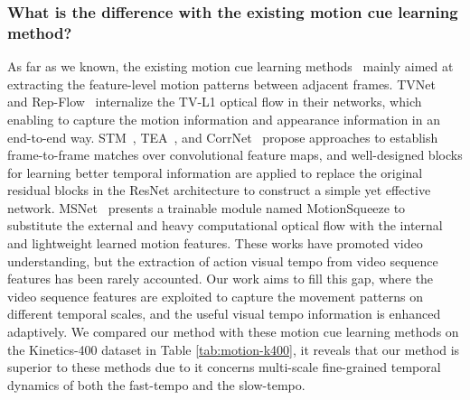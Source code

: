\documentclass[journal]{IEEEtran}
\begin{document}
\subsubsection{What is the difference with the existing motion cue learning method?}
As far as we known, the existing motion cue learning methods~\cite{fan2018end,kwon2020motionsqueeze,piergiovanni2019representation,jiang2019stm,wang2020video} mainly aimed at extracting the feature-level motion patterns between adjacent frames. TVNet~\cite{fan2018end} and Rep-Flow~\cite{fan2018end,piergiovanni2019representation} internalize the TV-L1 optical flow in their networks, which enabling to capture the motion information and appearance information in an end-to-end way. STM~\cite{jiang2019stm}, TEA~\cite{li2020tea}, and CorrNet~\cite{wang2020video} propose approaches to establish frame-to-frame matches over convolutional feature maps, and well-designed blocks for learning better temporal information are applied to replace the original residual blocks in the ResNet architecture to construct a simple yet effective network. MSNet~\cite{kwon2020motionsqueeze} presents a trainable module named MotionSqueeze to substitute the external and heavy computational optical flow with the internal and lightweight learned motion features. These works have promoted video understanding, but the extraction of action visual tempo from video sequence features has been rarely accounted. Our work aims to fill this gap, where the video sequence features are exploited to capture the movement patterns on different temporal scales, and the useful visual tempo information is enhanced adaptively. We compared our method with these motion cue learning methods on the Kinetics-400 dataset in Table \ref{tab:motion-k400}, it reveals that our method is superior to these methods due to it concerns multi-scale fine-grained temporal dynamics of both the fast-tempo and the slow-tempo.
\end{document}
